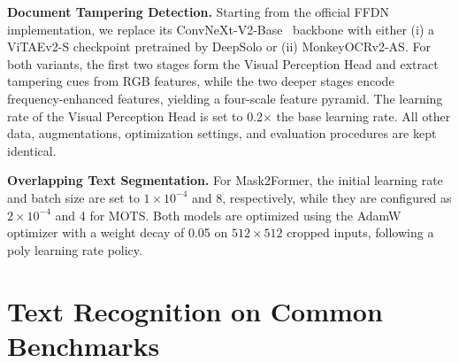 \documentclass{article}
\begin{document}
\textbf{Document Tampering Detection.} Starting from the official FFDN~\cite{chen2024enhancing} implementation, we replace its ConvNeXt-V2-Base~\cite{convnextv2} backbone with either (i) a ViTAEv2-S checkpoint pretrained by DeepSolo or (ii) MonkeyOCRv2-AS. For both variants, the first two stages form the Visual Perception Head and extract tampering cues from RGB features, while the two deeper stages encode frequency-enhanced features, yielding a four-scale feature pyramid. The learning rate of the Visual Perception Head is set to 0.2$\times$ the base learning rate. All other data, augmentations, optimization settings, and evaluation procedures are kept identical.

\textbf{Overlapping Text Segmentation.} For Mask2Former, the initial learning rate and batch size are set to $1\times 10^{-4}$ and 8, respectively, while they are configured as $2\times 10^{-4}$ and 4 for MOTS. Both models are optimized using the AdamW optimizer with a weight decay of 0.05 on $512\times 512$ cropped inputs, following a poly learning rate policy.



\section{Text Recognition on Common Benchmarks}
\label{sec:appendix_common}
\end{document}
